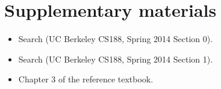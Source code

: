 \documentclass[11pt, a4paper]{article}
\begin{document}
\newpage

\section*{Supplementary materials}

\begin{itemize}
    \item Search (UC Berkeley CS188, Spring 2014 Section 0).


    \item Search (UC Berkeley CS188, Spring 2014 Section 1).


    \item Chapter 3 of the reference textbook.
\end{itemize}
\end{document}
